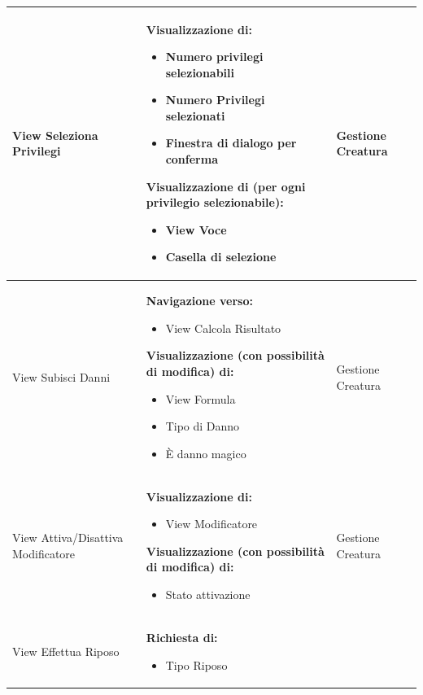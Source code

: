 \documentclass[a4paper, 11pt]{article}
\begin{document}
\begin{adjustwidth}{-1.5cm}{-1.5cm}
\begin{center}
\begin{longtable}{|p{5cm}|p{5cm}|p{5cm}|}
        View Seleziona Privilegi & \textbf{Visualizzazione di:}
        \begin{itemize}
            \item Numero privilegi selezionabili
            \item Numero Privilegi selezionati
            \item Finestra di dialogo per conferma
        \end{itemize}
        \textbf{Visualizzazione di (per ogni privilegio selezionabile):}
        \begin{itemize}
            \item View Voce
            \item Casella di selezione
        \end{itemize} & Gestione Creatura \\ \hline
        
        View Subisci Danni & \textbf{Navigazione verso:}
        \begin{itemize}
            \item View Calcola Risultato
        \end{itemize}
        \textbf{Visualizzazione (con possibilità di modifica) di:}
        \begin{itemize}
            \item View Formula
            \item Tipo di Danno
            \item È danno magico
        \end{itemize} & Gestione Creatura \\ \hline
        
        View Attiva/Disattiva Modificatore & \textbf{Visualizzazione di:}
        \begin{itemize}
            \item View Modificatore
        \end{itemize}
        \textbf{Visualizzazione (con possibilità di modifica) di:}
        \begin{itemize}
            \item Stato attivazione
        \end{itemize} & Gestione Creatura \\ \hline

        View Effettua Riposo & 
        \textbf{Richiesta di:}
        \begin{itemize}
            \item Tipo Riposo
        \end{itemize} 
        

\end{longtable}
\end{center}
\end{adjustwidth}
\end{document}
